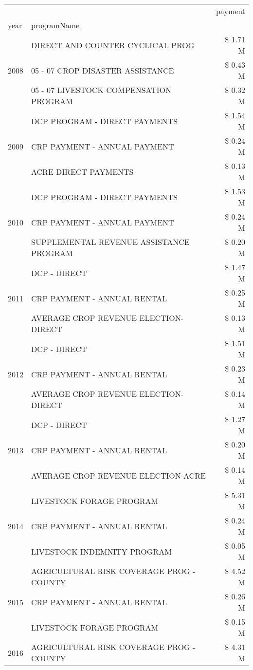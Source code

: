 \begin{tabular}{llr}
\toprule
 &  & payment \\
year & programName &  \\
\midrule
\multirow[t]{3}{*}{2008} & DIRECT AND COUNTER CYCLICAL PROG & \$ 1.71 M \\
 & 05 - 07 CROP DISASTER ASSISTANCE & \$ 0.43 M \\
 & 05 - 07 LIVESTOCK COMPENSATION PROGRAM & \$ 0.32 M \\
\cline{1-3}
\multirow[t]{3}{*}{2009} & DCP PROGRAM - DIRECT PAYMENTS & \$ 1.54 M \\
 & CRP PAYMENT - ANNUAL PAYMENT & \$ 0.24 M \\
 & ACRE DIRECT PAYMENTS & \$ 0.13 M \\
\cline{1-3}
\multirow[t]{3}{*}{2010} & DCP PROGRAM - DIRECT PAYMENTS & \$ 1.53 M \\
 & CRP PAYMENT - ANNUAL PAYMENT & \$ 0.24 M \\
 & SUPPLEMENTAL REVENUE ASSISTANCE PROGRAM & \$ 0.20 M \\
\cline{1-3}
\multirow[t]{3}{*}{2011} & DCP - DIRECT & \$ 1.47 M \\
 & CRP PAYMENT - ANNUAL RENTAL & \$ 0.25 M \\
 & AVERAGE CROP REVENUE ELECTION-DIRECT & \$ 0.13 M \\
\cline{1-3}
\multirow[t]{3}{*}{2012} & DCP - DIRECT & \$ 1.51 M \\
 & CRP PAYMENT - ANNUAL RENTAL & \$ 0.23 M \\
 & AVERAGE CROP REVENUE ELECTION-DIRECT & \$ 0.14 M \\
\cline{1-3}
\multirow[t]{3}{*}{2013} & DCP - DIRECT & \$ 1.27 M \\
 & CRP PAYMENT - ANNUAL RENTAL & \$ 0.20 M \\
 & AVERAGE CROP REVENUE ELECTION-ACRE & \$ 0.14 M \\
\cline{1-3}
\multirow[t]{3}{*}{2014} & LIVESTOCK FORAGE PROGRAM & \$ 5.31 M \\
 & CRP PAYMENT - ANNUAL RENTAL & \$ 0.24 M \\
 & LIVESTOCK INDEMNITY PROGRAM & \$ 0.05 M \\
\cline{1-3}
\multirow[t]{3}{*}{2015} & AGRICULTURAL RISK COVERAGE PROG - COUNTY & \$ 4.52 M \\
 & CRP PAYMENT - ANNUAL RENTAL & \$ 0.26 M \\
 & LIVESTOCK FORAGE PROGRAM & \$ 0.15 M \\
\cline{1-3}
\multirow[t]{3}{*}{2016} & AGRICULTURAL RISK COVERAGE PROG - COUNTY & \$ 4.31 M \\

\end{tabular}
